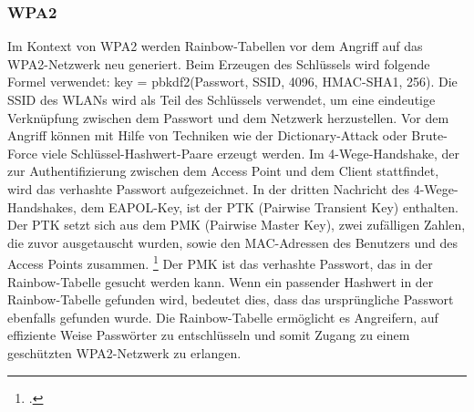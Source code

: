\subsubsection{WPA2}
Im Kontext von WPA2 werden Rainbow-Tabellen vor dem Angriff auf das WPA2-Netzwerk neu generiert. 
Beim Erzeugen des Schlüssels wird folgende Formel verwendet: key = pbkdf2(Passwort, SSID, 4096, HMAC-SHA1, 256). 
Die SSID des WLANs wird als Teil des Schlüssels verwendet, um eine eindeutige Verknüpfung zwischen dem Passwort und dem Netzwerk herzustellen. 
Vor dem Angriff können mit Hilfe von Techniken wie der Dictionary-Attack oder Brute-Force viele Schlüssel-Hashwert-Paare erzeugt werden.
Im 4-Wege-Handshake, der zur Authentifizierung zwischen dem Access Point und dem Client stattfindet, wird das verhashte Passwort aufgezeichnet. 
In der dritten Nachricht des 4-Wege-Handshakes, dem EAPOL-Key, ist der PTK (Pairwise Transient Key) enthalten. Der PTK setzt sich aus dem PMK (Pairwise Master Key), zwei zufälligen Zahlen, die zuvor ausgetauscht wurden, sowie den MAC-Adressen des Benutzers und des Access Points zusammen. \footcite[VGL]{professional}
Der PMK ist das verhashte Passwort, das in der Rainbow-Tabelle gesucht werden kann. 
Wenn ein passender Hashwert in der Rainbow-Tabelle gefunden wird, bedeutet dies, dass das ursprüngliche Passwort ebenfalls gefunden wurde. 
Die Rainbow-Tabelle ermöglicht es Angreifern, auf effiziente Weise Passwörter zu entschlüsseln und somit Zugang zu einem geschützten WPA2-Netzwerk zu erlangen. 


    
    
 
